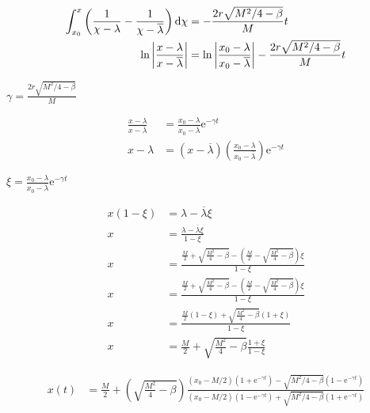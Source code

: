 \begin{align*}
\int_{x_0}^{x} \left(\frac{1}{\chi - \lambda}-\frac{1}{\chi - \overline{\lambda}}\right)\mathrm{d} \chi &=-\frac{2r\sqrt{M^2/4-\beta}}{M}t \\
	\ln\left|\frac{x - \lambda}{x - \overline{\lambda}}\right|&=\ln\left|\frac{x_0- \lambda}{x_0 - \overline{\lambda}}\right|-\frac{2r\sqrt{M^2/4-\beta}}{M}t
\end{align*}
	
$\gamma=\frac{2r\sqrt{M^2/4-\beta}}{M}$

\begin{align}
\frac{x - \lambda}{x - \overline{\lambda}} &=\frac{x_0- \lambda}{x_0- \overline{\lambda}}\mathrm e^{-\gamma t} \\
x-\lambda &=\left(x-\overline{\lambda}\right)\left(\frac{x_0- \lambda}{x_0- \overline{\lambda}}\right)\mathrm e^{-\gamma t}
\end{align}

$\xi=\frac{x_0-\lambda}{x_0-\overline{\lambda}}\mathrm{e}^{-\gamma t}$

\begin{align*}
	x\left(1-\xi\right)&=\lambda-\overline{\lambda}\xi\\
	x&=\frac{\lambda-\overline{\lambda}\xi}{1-\xi} \\	
	x&=\frac{\frac{M}{2}+\sqrt{\frac{M^2}{4}-\beta}-\left(\frac{M}{2}-\sqrt{\frac{M^2}{4}-\beta}\right)\xi}{1-\xi}\\
	x&=\frac{\frac{M}{2}+\sqrt{\frac{M^2}{4}-\beta}-\left(\frac{M}{2}-\sqrt{\frac{M^2}{4}-\beta}\right)\xi}{1-\xi}\\
	x&=\frac{\frac{M}{2}\left(1-\xi\right)+\sqrt{\frac{M^2}{4}-\beta}\left(1+\xi\right)}{1-\xi}\\
	x&=\frac{M}{2}+\sqrt{\frac{M^2}{4}-\beta}\frac{1+\xi}{1-\xi}
\end{align*}

\begin{align}
	x(t)&=\frac{M}{2}+\left(\sqrt{\frac{M^2}{4}-\beta}\right)\frac{\left(x_0-M/2\right)\left(1+\mathrm e^{-\gamma t}\right)-\sqrt{M^2/4-\beta}\left(1-\mathrm{e}^{-\gamma t}\right)}{\left(x_0-M/2\right)\left(1-\mathrm e^{-\gamma t}\right)+\sqrt{M^2/4-\beta}\left(1+\mathrm{e}^{-\gamma t}\right)}
\end{align}

